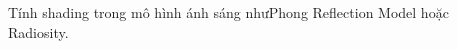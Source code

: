 \documentclass[preview]{standalone}
\begin{document}
\begin{center}
Tính shading trong mô hình ánh sáng nhưPhong Reflection Model hoặc Radiosity.
\end{center}
\end{document}
